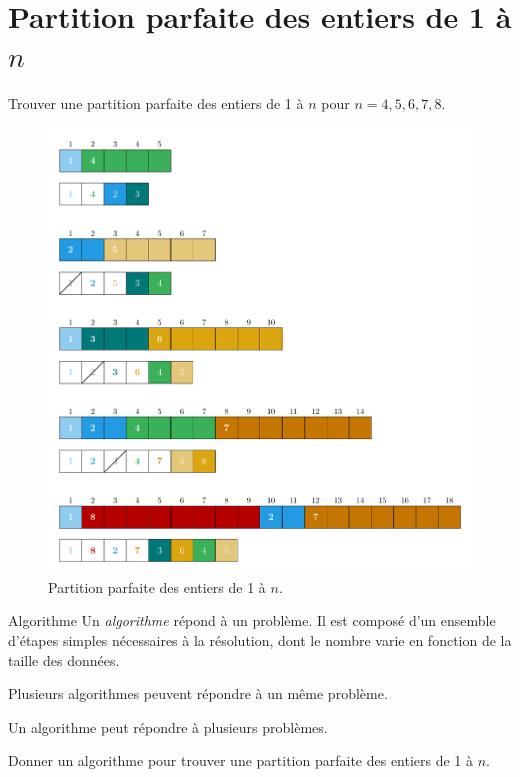 \documentclass[11pt]{article}
\begin{document}
\section{Partition parfaite des entiers de 1 à $n$}

  \begin{exercice}{}
    Trouver une partition parfaite des entiers de 1 à $n$ pour $n =4, 5, 6, 7, 8$.
  \end{exercice}


  \begin{figure}[htbp]
    \centering
    \includegraphics[width=0.6\linewidth]{partition-8.pdf}
    \caption{Partition parfaite des entiers de 1 à $n$.}
  \end{figure}


  \begin{definition}{Algorithme}
    Un \emph{algorithme} répond à un problème. Il est composé d’un ensemble d’étapes simples nécessaires à la résolution, dont le nombre varie en fonction de la taille des données.
  \end{definition}

  \begin{remarque}{}
    Plusieurs algorithmes peuvent répondre à un même problème.
  \end{remarque}

  \begin{remarque}{}
    Un algorithme peut répondre à plusieurs problèmes.
  \end{remarque}

  \begin{exercice}{}
    Donner un algorithme pour trouver une partition parfaite des entiers de 1 à $n$.
  \end{exercice}
\end{document}
